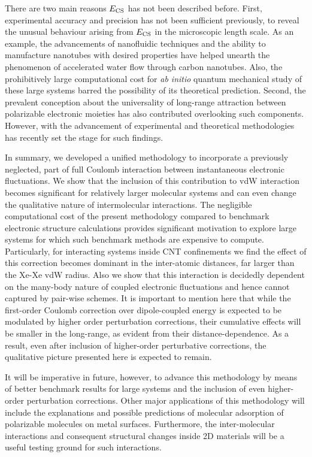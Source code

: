 \documentclass[aps,prl,groupaddress, twocolumn]{revtex4-1}  %
\begin{document}
There are two main reasons $E_{\rm CS}$ has not been described before. First, experimental accuracy and precision has not been sufficient previously, to reveal the unusual behaviour arising from $E_{\rm CS}$ in the microscopic length scale. As an example, the advancements of nanofluidic techniques and the ability to manufacture nanotubes with desired properties have helped unearth the phenomenon of accelerated water flow through carbon nanotubes. Also, the prohibitively large computational cost for \textit{ab initio} quantum mechanical study of these large systems barred the possibility of its theoretical prediction. Second, the prevalent conception about the universality of long-range attraction between polarizable electronic moieties has also contributed overlooking such components. However, with the advancement of experimental and theoretical methodologies has recently set the stage for such findings.

In summary, we developed a unified methodology to incorporate a previously neglected, part of full Coulomb interaction between instantaneous electronic fluctuations. We show that the inclusion of this contribution to vdW interaction becomes significant for relatively larger molecular systems and can even change the qualitative nature of intermolecular interactions. The negligible computational cost of the present methodology compared to benchmark electronic structure calculations provides significant motivation to explore large systems for which such benchmark methods are expensive to compute. Particularly, for interacting systems inside CNT confinements we find the effect of this correction becomes dominant in the inter-atomic distances, far larger than the Xe-Xe vdW radius. Also we show that this interaction is decidedly dependent on the many-body nature of coupled electronic fluctuations and hence cannot captured by pair-wise schemes. It is important to mention here that while the first-order Coulomb correction over dipole-coupled energy is expected to be modulated by higher order perturbation corrections, their cumulative effects will be smaller in the long-range, as evident from their distance-dependence\cite{sadhukhan_prl_2017}. As a result, even after inclusion of higher-order perturbative corrections, the qualitative picture presented here is expected to remain.

It will be imperative in future, however, to advance this methodology by means of better benchmark results for large systems and the inclusion of even higher-order perturbation corrections. Other major applications of this methodology will include the explanations and possible predictions of molecular adsorption of polarizable molecules on metal surfaces. Furthermore, the inter-molecular interactions and consequent structural changes inside 2D materials will be a useful testing ground for such interactions.\\
\end{document}
